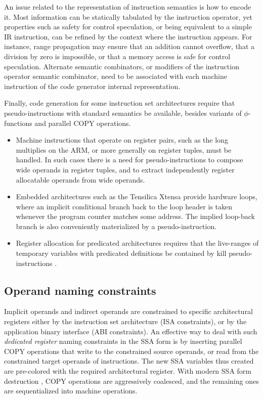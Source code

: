 An issue related to the representation of instruction semantics is how to
encode it. Most information can be statically tabulated by the instruction operator,
yet properties such as safety for control speculation, or being equivalent to a
simple IR instruction, can be refined by the context where the instruction
appears. For instance, range propagation may ensure that an addition cannot
overflow, that a division by zero is impossible, or that a memory access is safe
for control speculation.  Alternate semantic combinators, or modifiers of the
instruction operator semantic combinator, need to be associated with each
machine instruction of the code generator internal representation.

Finally, code generation for some instruction set architectures require that
pseudo-instructions with standard semantics be available, besides variants of
$\phi$-functions and parallel COPY operations. \begin{itemize}

\item Machine instructions that operate on register pairs, such as the long
multiplies on the ARM, or more generally on register tuples, must be handled. In such
cases there is a need for pseudo-instructions to compose wide operands in
register tuples, and to extract independently register allocatable operands from
wide operands.

\item Embedded architectures such as the Tensilica Xtensa
\cite{Leison:2006:Book} provide hardware
loops, where an implicit conditional branch back to the loop header is taken
whenever the program counter matches some address. The implied loop-back branch
is also conveniently materialized by a pseudo-instruction.

\item Register allocation for predicated architectures requires that the live-ranges
of temporary variables with predicated definitions be contained by
kill pseudo-instructions \cite{Gillies:1996:MICRO}.

\end{itemize}

\subsection{Operand naming constraints}

Implicit operands and indirect operands are constrained to specific
architectural registers either by the instruction set architecture (ISA
constraints), or by the application binary interface (ABI constraints). An
effective way to deal with such \emph{dedicated register} naming constraints in
the SSA form is by inserting parallel COPY operations that write to the
constrained source operands, or read from the constrained target operands of
instructions.  The new SSA variables thus created are pre-colored with the
required architectural register. With modern SSA form destruction
\cite{Sreedhar:1999:SAS,Boissinot:2009:CGO}, COPY operations are aggressively
coalesced, and the remaining ones are sequentialized into machine operations.

